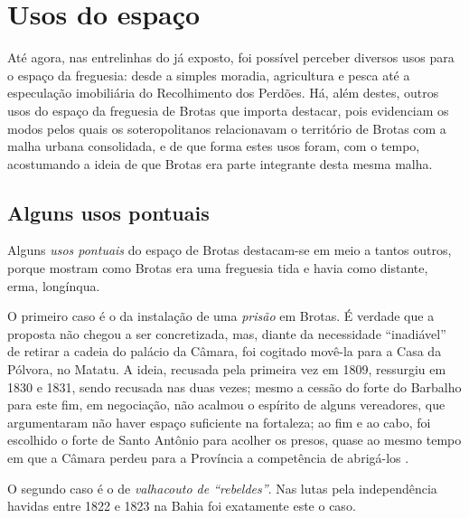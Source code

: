 \section{Usos do espaço}\label{sec:2.4}

Até agora, nas entrelinhas do já exposto, foi possível perceber diversos usos para o espaço da freguesia: desde a simples moradia, agricultura e pesca até a especulação imobiliária do Recolhimento dos Perdões. Há, além destes, outros usos do espaço da freguesia de Brotas que importa destacar, pois evidenciam os modos pelos quais os soteropolitanos relacionavam o território de Brotas com a malha urbana consolidada, e de que forma estes usos foram, com o tempo, acostumando a ideia de que Brotas era parte integrante desta mesma malha.

\subsection{Alguns usos pontuais}

Alguns \textit{usos pontuais} do espaço de Brotas destacam-se em meio a tantos outros, porque mostram como Brotas era uma freguesia tida e havia como distante, erma, longínqua.

O primeiro caso é o da instalação de uma \textit{prisão} em Brotas. É verdade que a proposta não chegou a ser concretizada, mas, diante da necessidade ``inadiável'' de retirar a cadeia do palácio da Câmara, foi cogitado movê-la para a Casa da Pólvora, no Matatu. A ideia, recusada pela primeira vez em 1809, ressurgiu em 1830 e 1831, sendo recusada nas duas vezes; mesmo a cessão do forte do Barbalho para este fim, em negociação, não acalmou o espírito de alguns vereadores, que argumentaram não haver espaço suficiente na fortaleza; ao fim e ao cabo, foi escolhido o forte de Santo Antônio para acolher os presos, quase ao mesmo tempo em que a Câmara perdeu para a Província a competência de abrigá-los \cite[pp.~304-305]{ruy_camara_1953}.

O segundo caso é o de \textit{valhacouto de ``rebeldes''}. Nas lutas pela independência havidas entre 1822 e 1823 na Bahia foi exatamente este o caso. 

